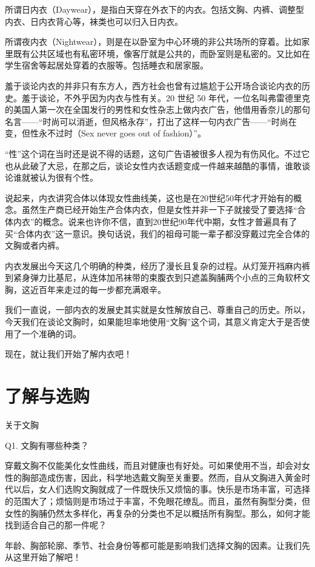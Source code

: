 \documentclass[12pt,UTF8]{ctexbook}
\begin{document}
所谓日内衣（Daywear），是指白天穿在外衣下的内衣。包括文胸、内裤、调整型内衣、日内衣背心等，袜类也可以归入日内衣。

所谓夜内衣（Nightwear），则是在以卧室为中心环境的非公共场所的穿着。比如家里既有公共区域也有私密环境，像客厅就是公共的，而卧室则是私密的。又比如在学生宿舍等起居处穿着的衣服等。包括睡衣和居家服。

羞于谈论内衣的并非只有东方人，西方社会也曾有过尴尬于公开场合谈论内衣的历史。羞于谈论，不外乎因为内衣与性有关。20 世纪 50 年代，一位名叫弗雷德里克的美国人第一次在全国发行的男性和女性杂志上做内衣广告，他借用香奈儿的那句名言——“时尚可以消逝，但风格永存”，打出了这样一句内衣广告——“时尚在变，但性永不过时（Sex never goes out of fashion）”。

“性”这个词在当时还是说不得的话题，这句广告语被很多人视为有伤风化。不过它也从此破了大忌，在那之后，谈论女性内衣话题变成一件越来越酷的事情，谁敢谈论谁就被认为很有个性。

说起来，内衣讲究合体以体现女性曲线美，这也是在20世纪50年代才开始有的概念。虽然生产商已经开始生产合体内衣，但是女性并非一下子就接受了要选择“合体内衣”的概念。说来也许你不信，直到20世纪90年代中期，女性才普遍具有了买“合体内衣”这一意识。换句话说，我们的祖母可能一辈子都没穿戴过完全合体的文胸或者内裤。

内衣发展出今天这几个明确的种类，经历了漫长且复杂的过程。从灯笼开裆麻内裤到紧身弹力比基尼，从连体加吊袜带的束腹衣到只遮盖胸脯两个小点的三角软杯文胸，这近百年来走过的每一步都充满艰辛。

我们一直说，一部内衣的发展史其实就是女性解放自己、尊重自己的历史。所以，今天我们在谈论文胸时，如果能坦率地使用“文胸”这个词，其意义肯定大于是否使用了一个准确的词。

现在，就让我们开始了解内衣吧！

\chapter{了解与选购}

关于文胸

Q1. 文胸有哪些种类？

穿戴文胸不仅能美化女性曲线，而且对健康也有好处。可如果使用不当，却会对女性的胸部造成伤害，因此，科学地选戴文胸至关重要。然而，自从文胸进入黄金时代以后，女人们选购文胸就成了一件既快乐又烦恼的事。快乐是市场丰富，可选择的范围大了；烦恼则是市场过于丰富，不免眼花缭乱。而且，虽然有胸型分类，但女性的胸脯仍然太多样化，再复杂的分类也不足以概括所有胸型。那么，如何才能找到适合自己的那一件呢？

年龄、胸部轮廓、季节、社会身份等都可能是影响我们选择文胸的因素。让我们先从这里开始了解吧！
\end{document}
